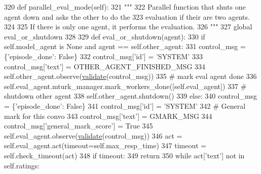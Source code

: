\begin{DoxyCode}
320     \textcolor{keyword}{def }parallel\_eval\_mode(self):
321         \textcolor{stringliteral}{"""}
322 \textcolor{stringliteral}{        Parallel function that shuts one agent down and asks the other to do the}
323 \textcolor{stringliteral}{        evaluation if their are two agents.}
324 \textcolor{stringliteral}{}
325 \textcolor{stringliteral}{        If there is only one agent, it performs the evaluation.}
326 \textcolor{stringliteral}{        """}
327         \textcolor{keyword}{global} eval\_or\_shutdown
328 
329         \textcolor{keyword}{def }eval\_or\_shutdown(agent):
330             \textcolor{keywordflow}{if} self.model\_agent \textcolor{keywordflow}{is} \textcolor{keywordtype}{None} \textcolor{keywordflow}{and} agent == self.other\_agent:
331                 control\_msg = \{\textcolor{stringliteral}{'episode\_done'}: \textcolor{keyword}{False}\}
332                 control\_msg[\textcolor{stringliteral}{'id'}] = \textcolor{stringliteral}{'SYSTEM'}
333                 control\_msg[\textcolor{stringliteral}{'text'}] = OTHER\_AGENT\_FINISHED\_MSG
334                 self.other\_agent.observe(\hyperlink{namespaceparlai_1_1core_1_1worlds_afc3fad603b7bce41dbdc9cdc04a9c794}{validate}(control\_msg))
335                 \textcolor{comment}{# mark eval agent done}
336                 self.eval\_agent.mturk\_manager.mark\_workers\_done([self.eval\_agent])
337                 \textcolor{comment}{# shutdown other agent}
338                 self.other\_agent.shutdown()
339             \textcolor{keywordflow}{else}:
340                 control\_msg = \{\textcolor{stringliteral}{'episode\_done'}: \textcolor{keyword}{False}\}
341                 control\_msg[\textcolor{stringliteral}{'id'}] = \textcolor{stringliteral}{'SYSTEM'}
342                 \textcolor{comment}{# General mark for this convo}
343                 control\_msg[\textcolor{stringliteral}{'text'}] = GMARK\_MSG
344                 control\_msg[\textcolor{stringliteral}{'general\_mark\_score'}] = \textcolor{keyword}{True}
345                 self.eval\_agent.observe(\hyperlink{namespaceparlai_1_1core_1_1worlds_afc3fad603b7bce41dbdc9cdc04a9c794}{validate}(control\_msg))
346                 act = self.eval\_agent.act(timeout=self.max\_resp\_time)
347                 timeout = self.check\_timeout(act)
348                 \textcolor{keywordflow}{if} timeout:
349                     \textcolor{keywordflow}{return}
350                 \textcolor{keywordflow}{while} act[\textcolor{stringliteral}{'text'}] \textcolor{keywordflow}{not} \textcolor{keywordflow}{in} self.ratings:

\end{DoxyCode}
